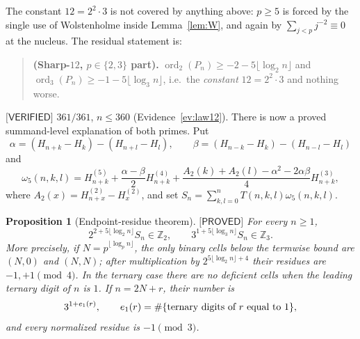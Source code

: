 \documentclass[11pt,reqno]{amsart}
\theoremstyle{plain}
\newtheorem{proposition}[theorem]{Proposition}
\theoremstyle{definition}
\theoremstyle{remark}
\numberwithin{equation}{section}
\newcommand{\ord}{\operatorname{ord}}
\newcommand{\PROVED}{\textsf{[PROVED]}}
\newcommand{\VERIFIED}{\textsf{[VERIFIED]}}
\begin{document}
The constant $12=2^2\cdot3$ is not covered by anything above: $p\ge5$ is forced by the single
use of Wolstenholme inside Lemma~\ref{lem:W}, and again by $\sum_{j<p}j^{-2}\equiv0$ at the
nucleus. The residual statement is:

\begin{quote}
\textbf{(Sharp-$12$, $p\in\{2,3\}$ part).}
$\ord_2(P_n)\ge-2-5\lfloor\log_2n\rfloor$ and $\ord_3(P_n)\ge-1-5\lfloor\log_3n\rfloor$,
i.e.\ the \emph{constant} $12=2^2\cdot3$ and nothing worse.
\end{quote}

$\VERIFIED$ $361/361$, $n\le360$ (Evidence~\ref{ev:law12}).  There is now a
proved summand-level explanation of both primes.  Put
\[
 \alpha=(H_{n+k}-H_k)-(H_{n+l}-H_l),\qquad
 \beta=(H_{n-k}-H_k)-(H_{n-l}-H_l)
\]
and
\begin{equation}\label{eq:compact-low-prime}
 \omega_5(n,k,l)=H_{n+k}^{(5)}+\frac{\alpha-\beta}{2}H_{n+k}^{(4)}
 +\frac{A_2(k)+A_2(l)-\alpha^2-2\alpha\beta}{4}H_{n+k}^{(3)},
\end{equation}
where $A_2(x)=H_{n+x}^{(2)}-H_x^{(2)}$, and set
$S_n=\sum_{k,l=0}^nT(n,k,l)\omega_5(n,k,l)$.

\begin{proposition}[Endpoint-residue theorem]\label{prop:endpoint23}
$\PROVED$ For every $n\ge1$,
\[
 2^{2+5\lfloor\log_2n\rfloor}S_n\in\mathbb Z_2,
 \qquad
 3^{1+5\lfloor\log_3n\rfloor}S_n\in\mathbb Z_3.
\]
More precisely, if $N=p^{\lfloor\log_pn\rfloor}$, the only binary cells below
the termwise bound are $(N,0)$ and $(N,N)$; after multiplication by
$2^{5\lfloor\log_2n\rfloor+4}$ their residues are $-1,+1\pmod4$.  In the
ternary case there are no deficient cells when the leading ternary digit of
$n$ is $1$.  If $n=2N+r$, their number is
\[
 3^{1+e_1(r)},\qquad
 e_1(r)=\#\{\hbox{ternary digits of $r$ equal to $1$}\},
\]
and every normalized residue is $-1\pmod3$.
\end{proposition}
\end{document}
